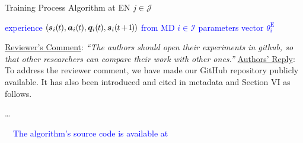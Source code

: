 \documentclass[12pt,draftclsnofoot,onecolumn]{IEEEtran}
\newcommand{\rev}[1]{{\color{blue}#1}} %
\newcommand{\rev}[1]{#1}
\newenvironment{my}[2]%
{\begin{list}{}%
{\setlength{\rightmargin}{#1}\setlength{\leftmargin}{#2}}%


 \item[]{}

} {\end{list}}
\begin{document}
\begin{enumerate}
\begin{my}{0.5cm}{0.5cm}
{\begin{minipage}[b]{0.87\textwidth} 
	\begin{algorithm}[H] \caption{Training Process Algorithm at EN $j \in \mathcal{J}$}\label{alg:cap2} \centering 
		\begin{algorithmic}[1] 		\renewcommand{\algorithmicrequire}{\textbf{\textcolor{blue}{Input:}}} 
			\renewcommand{\algorithmicensure}{\textbf{\textcolor{blue}{Output:}}}
			\Require \textcolor{blue}{experience $(\hspace{-0.2mm}\boldsymbol{s}_i(\hspace{-0.2mm}t\hspace{-0.2mm}), \boldsymbol{a}_i(\hspace{-0.2mm}t\hspace{-0.2mm}), \boldsymbol{q}_i(\hspace{-0.2mm}t\hspace{-0.2mm}), \boldsymbol{s}_i(\hspace{-0.2mm}t\hspace{-0.3mm}+\hspace{-0.3mm}\hspace{-0.2mm}1\hspace{-0.2mm}\hspace{-0.2mm})\hspace{-0.2mm})$ from MD $i \in \mathcal{I}$}
			\Ensure \textcolor{blue}{parameters vector $\theta_i^{\text{E}}$ }
		\end{algorithmic} 
	\end{algorithm} 
\end{minipage}}
\end{my}
	

\vspace{10mm}
	\item \underline{Reviewer's Comment}: 
	\textit{``The authors should open their experiments in github, so that other researchers can compare their work with other ones.''} \newline
	\underline{Authors' Reply}: To address the reviewer comment, we have made our GitHub repository  publicly available. It has also been introduced and cited in metadata and Section VI as follows.
	
	\begin{my}{1cm}{1cm}
		\rev{
			
			\dots
			
			\,\,\,\, \textcolor{blue}{The algorithm's source code is available at \cite{QECO}}

	}
	\end{my} \vspace{2mm}


\end{enumerate}
\end{document}
